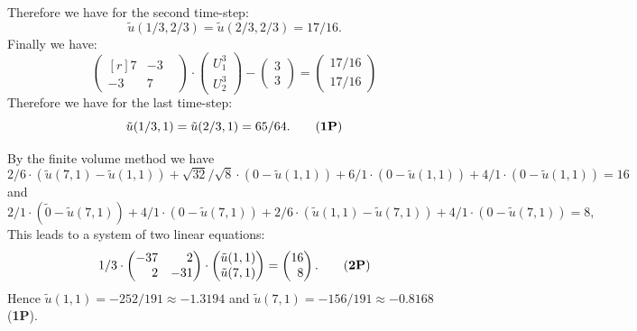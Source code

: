 \begin{loesung}
\begin{teilaufgaben}
\[\]
Therefore we have for the second time-step:
\[
\tilde u(1/3,2/3) = \tilde u(2/3, 2/3) = 17/16.
\]
Finally we have:
\[
\begin{pmatrix*}[r]  7 & -3 &  \\  -3 & 7 \end{pmatrix*}
\cdot
\begin{pmatrix} U_1^{3} \\  U_2^{3}  \end{pmatrix}
-
\begin{pmatrix} 3\\  3  \end{pmatrix}
=
\begin{pmatrix} 17/16 \\  17/16 \end{pmatrix}
\]
Therefore we have for the last time-step:
\begin{equation}
\tilde u(1/3,1) = \tilde u(2/3, 1) = 65/64.
\tag{\textbf{1P}}
\end{equation}
\item
By the finite volume method we have
\[
2/6 \cdot (\tilde u(7,1) - \tilde u(1,1))
+
\sqrt{32}/\sqrt{8} \cdot (0 - \tilde u(1,1))
+
6/1 \cdot (0 - \tilde u(1,1))
+
4/1 \cdot (0 - \tilde u(1,1))
=
16
\]
and
\[
2/1 \cdot (\tilde 0 - \tilde u(7,1))
+
4/1 \cdot (0  - \tilde u(7,1))
+
2/6 \cdot (\tilde u(1,1)- \tilde u(7,1))
+
4/1 \cdot (0 - \tilde u(7,1)) = 8,
\]
This leads to a system of two linear equations:
\begin{equation}
1/3
\cdot
\begin{pmatrix*}[r]
-37 & 2 \\
 2 & -31
\end{pmatrix*}
\cdot
\begin{pmatrix}
\tilde u(1,1)  \\
\tilde u(7,1)
\end{pmatrix}
=
\begin{pmatrix*}[r]
16 \\
 8
\end{pmatrix*}.
\tag{\textbf{2P}}
\end{equation}
Hence $\tilde u(1,1) = -252/191 \approx -1.3194$ and
$\tilde u(7,1) = -156/191 \approx -0.8168$ (\textbf{1P}).
\qedhere
\end{teilaufgaben}
\end{loesung}
